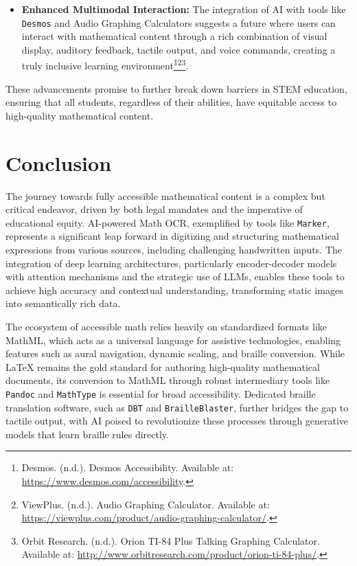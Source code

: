 \begin{itemize}
    \item \textbf{Enhanced Multimodal Interaction:} The integration of AI with tools like \texttt{Desmos} and Audio Graphing Calculators suggests a future where users can interact with mathematical content through a rich combination of visual display, auditory feedback, tactile output, and voice commands, creating a truly inclusive learning environment\footnote{Desmos. (n.d.). Desmos Accessibility. Available at: \url{https://www.desmos.com/accessibility}.}\footnote{ViewPlus. (n.d.). Audio Graphing Calculator. Available at: \url{https://viewplus.com/product/audio-graphing-calculator/}.}\footnote{Orbit Research. (n.d.). Orion TI-84 Plus Talking Graphing Calculator. Available at: \url{http://www.orbitresearch.com/product/orion-ti-84-plus/}.}.
\end{itemize}
These advancements promise to further break down barriers in STEM education, ensuring that all students, regardless of their abilities, have equitable access to high-quality mathematical content.

\section{Conclusion}\label{sec:conclusion-mathocr}
The journey towards fully accessible mathematical content is a complex but critical endeavor, driven by both legal mandates and the imperative of educational equity. AI-powered Math OCR, exemplified by tools like \texttt{Marker}, represents a significant leap forward in digitizing and structuring mathematical expressions from various sources, including challenging handwritten inputs. The integration of deep learning architectures, particularly encoder-decoder models with attention mechanisms and the strategic use of LLMs, enables these tools to achieve high accuracy and contextual understanding, transforming static images into semantically rich data.

The ecosystem of accessible math relies heavily on standardized formats like MathML, which acts as a universal language for assistive technologies, enabling features such as aural navigation, dynamic scaling, and braille conversion. While LaTeX remains the gold standard for authoring high-quality mathematical documents, its conversion to MathML through robust intermediary tools like \texttt{Pandoc} and \texttt{MathType} is essential for broad accessibility. Dedicated braille translation software, such as \texttt{DBT} and \texttt{BrailleBlaster}, further bridges the gap to tactile output, with AI poised to revolutionize these processes through generative models that learn braille rules directly.

